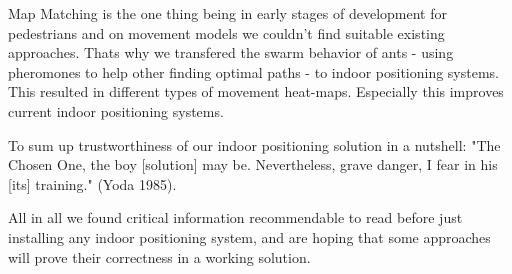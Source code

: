 Map Matching is the one thing being in early stages of development for pedestrians and on movement models we couldn't find suitable existing approaches. Thats why we transfered the swarm behavior of ants - using pheromones to help other finding optimal paths - to indoor positioning systems. This resulted in different types of movement heat-maps. Especially this improves current indoor positioning systems.

To sum up trustworthiness of our indoor positioning solution in a nutshell: "The Chosen One, the boy [solution] may be. Nevertheless, grave danger, I fear in his [its] training." (Yoda 1985).

All in all we found critical information recommendable to read before just installing any indoor positioning system, and are hoping that some approaches will prove their correctness in a working solution.


